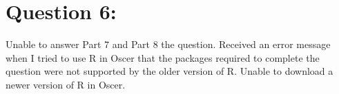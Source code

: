 \documentclass{article}
\begin{document}
\section{Question 6:}
Unable to answer Part 7 and Part 8  the question. Received an error message when I tried to use R in Oscer that the packages required to complete the question were not supported by the older version of R. Unable to download a newer version of R in Oscer. 
\end{document}
